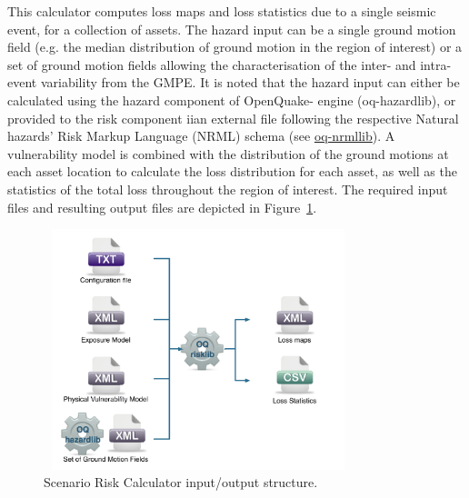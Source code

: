 This calculator computes loss maps and loss statistics due to a single seismic
event, for a collection of assets. The hazard input can be a single ground
motion field (e.g. the median distribution of ground motion in the region of
interest) or a set of ground motion fields allowing the characterisation of
the inter- and intra-event variability from the GMPE. It is noted that the
hazard input can either be calculated using the hazard component of OpenQuake-
engine (oq-hazardlib), or provided to the risk component iian external file
following the respective Natural hazards' Risk Markup Language (NRML) schema
(see \href{http://github.com/gem/oq-nrmllib}{oq-nrmllib}). A vulnerability
model is combined with the distribution of the ground motions at each asset
location to calculate the loss distribution for each asset, as well as the
statistics of the total loss throughout the region of interest. The required
input files and resulting output files are depicted in
Figure~\ref{fig:io-structure-scenario-risk}.

\begin{figure}[ht]
\centering
\includegraphics[width=9cm,height=7cm]{figures/risk/io-structure-scenario-risk.pdf}
\caption{Scenario Risk Calculator input/output structure.}
\label{fig:io-structure-scenario-risk}
\end{figure}